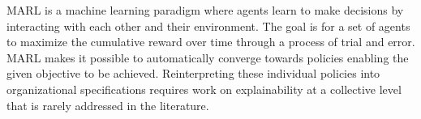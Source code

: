 \documentclass[runningheads]{llncs}
\begin{document}
MARL is a machine learning paradigm where agents learn to make decisions by interacting with each other and their environment. The goal is for a set of agents to maximize the cumulative reward over time through a process of trial and error.
MARL makes it possible to automatically converge towards policies enabling the given objective to be achieved. Reinterpreting these individual policies into organizational specifications requires work on explainability at a collective level that is rarely addressed in the literature.




















\end{document}
